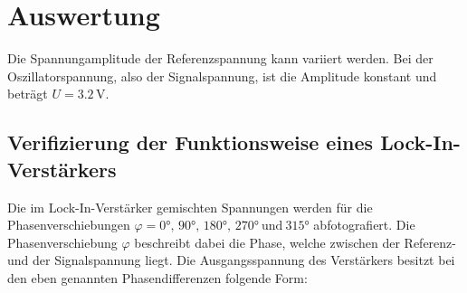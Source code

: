 %

%
\section{Auswertung}
\label{sec:Auswertung}

Die Spannungamplitude der Referenzspannung kann variiert werden. Bei der Oszillatorspannung, also der Signalspannung, 
ist die Amplitude konstant und beträgt $U=3.2 \, \unit{\volt}$.\\

\subsection{Verifizierung der Funktionsweise eines Lock-In-Verstärkers}

Die im Lock-In-Verstärker gemischten Spannungen werden für die Phasenverschiebungen 
$\varphi= 0°,\, 90°,\, 180°,\, 270° \ \text{und} \ 315°$ abfotografiert. Die Phasenverschiebung $\varphi$ beschreibt dabei die 
Phase, welche zwischen der Referenz- und der Signalspannung liegt. Die Ausgangsspannung des Verstärkers besitzt bei den eben genannten Phasendifferenzen 
folgende Form:


